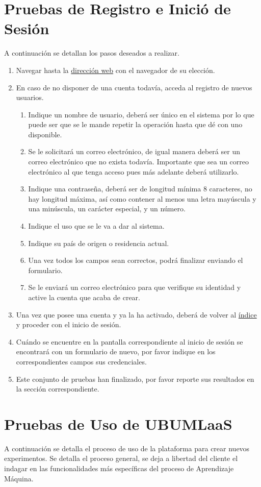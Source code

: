 \documentclass[
	12pt,
	spanish
]{article}
\newcommand{\direccion}{http://puenramihome.ddns.net:8081}
\begin{document}
\section{Pruebas de Registro e Inició de Sesión}
A continuación se detallan los pasos deseados a realizar.
\begin{enumerate}
\item Navegar hasta la \href{\direccion}{dirección web} con el navegador de su elección.
\item En caso de no disponer de una cuenta todavía, acceda al registro de nuevos usuarios.
\begin{enumerate}
\item Indique un nombre de usuario, deberá ser único en el sistema por lo que puede ser que se le mande repetir la operación hasta que dé con uno disponible.
\item Se le solicitará un correo electrónico, de igual manera deberá ser un correo electrónico que no exista todavía. Importante que sea un correo electrónico al que tenga acceso pues más adelante deberá utilizarlo.
\item Indique una contraseña, deberá ser de longitud mínima 8 caracteres, no hay longitud máxima, así como contener al menos una letra mayúscula y una minúscula, un carácter especial, y un número.
\item Indique el uso que se le va a dar al sistema.
\item Indique su país de origen o residencia actual.
\item Una vez todos los campos sean correctos, podrá finalizar enviando el formulario.
\item Se le enviará un correo electrónico para que verifique su identidad y active la cuenta que acaba de crear.
\end{enumerate}
\item Una vez que posee una cuenta y ya la ha activado, deberá de volver al \href{\direccion}{índice} y proceder con el inicio de sesión.
\item Cuándo se encuentre en la pantalla correspondiente al inicio de sesión se encontrará con un formulario de nuevo, por favor indique en los correspondientes campos sus credenciales.
\item Este conjunto de pruebas han finalizado, por favor reporte sus resultados en la sección correspondiente.
\end{enumerate}

\clearpage
\section{Pruebas de Uso de UBUMLaaS}
A continuación se detalla el proceso de uso de la plataforma para crear nuevos experimentos. Se detalla el proceso general, se deja a libertad del cliente el indagar en las funcionalidades más específicas del proceso de Aprendizaje Máquina.
\end{document}
